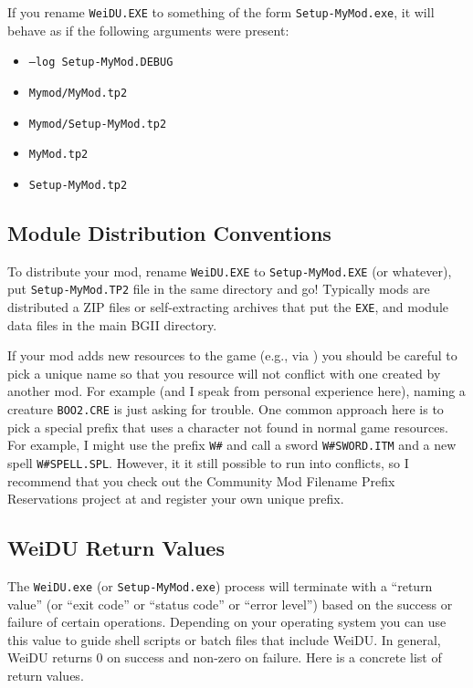 \documentclass{article}
\def\ttref#1{\ahrefloc{#1}{\tt #1}}
\def\t#1{{\tt #1}}
\begin{document}
If you rename \t{WeiDU.EXE} to something of the form \t{Setup-MyMod.exe},
it will behave as if the following arguments were present:
\begin{itemize}
\item \t{--log Setup-MyMod.DEBUG}
\item \t{Mymod/MyMod.tp2}
\item \t{Mymod/Setup-MyMod.tp2}
\item \t{MyMod.tp2}
\item \t{Setup-MyMod.tp2}
\end{itemize}

\subsection{Module Distribution Conventions}

To distribute your mod, rename \t{WeiDU.EXE} to \t{Setup-MyMod.EXE} (or
whatever), put \t{Setup-MyMod.TP2} file in the same directory and go!
Typically mods are distributed a ZIP files or self-extracting archives that
put the \t{EXE}, \ttref{TP2} and module data files in the main BGII
directory.

If your mod adds new resources to the game (e.g., via \ttref{COPY}) you
should be careful to pick a unique name so that you resource will not
conflict with one created by another mod. For example (and I speak from
personal experience here), naming a creature \t{BOO2.CRE} is just asking
for trouble. One common approach here is to pick a special prefix that uses
a character not found in normal game resources. For example, I might use
the prefix \t{W\#} and call a sword \t{W\#SWORD.ITM}
and a new spell \t{W\#SPELL.SPL}. However, it it still possible to run into
conflicts, so I recommend that you check out the
Community Mod Filename Prefix Reservations project at
 and
register your own unique prefix.

\subsection{WeiDU Return Values}

The \t{WeiDU.exe} (or \t{Setup-MyMod.exe}) process will terminate with
a ``return value'' (or ``exit code'' or ``status code'' or ``error level'')
based on the success or failure of certain operations. Depending on your
operating system you can use this value to guide shell scripts or batch
files that include WeiDU. In general, WeiDU returns 0 on success and
non-zero on failure. Here is a concrete list of return values.
\end{document}
